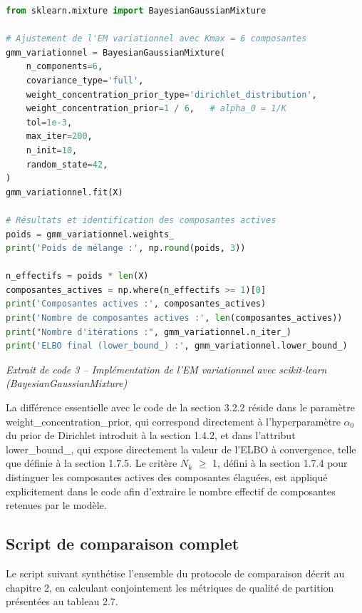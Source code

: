 \begin{lstlisting}[language=Python]
from sklearn.mixture import BayesianGaussianMixture

# Ajustement de l'EM variationnel avec Kmax = 6 composantes
gmm_variationnel = BayesianGaussianMixture(
    n_components=6,
    covariance_type='full',
    weight_concentration_prior_type='dirichlet_distribution',
    weight_concentration_prior=1 / 6,   # alpha_0 = 1/K
    tol=1e-3,
    max_iter=200,
    n_init=10,
    random_state=42,
)
gmm_variationnel.fit(X)

# Résultats et identification des composantes actives
poids = gmm_variationnel.weights_
print('Poids de mélange :', np.round(poids, 3))

n_effectifs = poids * len(X)
composantes_actives = np.where(n_effectifs >= 1)[0]
print('Composantes actives :', composantes_actives)
print('Nombre de composantes actives :', len(composantes_actives))
print("Nombre d'itérations :", gmm_variationnel.n_iter_)
print('ELBO final (lower_bound_) :', gmm_variationnel.lower_bound_)
\end{lstlisting}
\begin{center}\small\emph{Extrait de code 3 -- Implémentation de l'EM variationnel avec scikit-learn (BayesianGaussianMixture)}\end{center}
La différence essentielle avec le code de la section 3.2.2 réside dans le paramètre weight\_concentration\_prior, qui correspond directement à l'hyperparamètre $\alpha _{0}$ du prior de Dirichlet introduit à la section 1.4.2, et dans l'attribut lower\_bound\_, qui expose directement la valeur de l'ELBO à convergence, telle que définie à la section 1.7.5. Le critère $N_{k}$ $\geq $ 1, défini à la section 1.7.4 pour distinguer les composantes actives des composantes élaguées, est appliqué explicitement dans le code afin d'extraire le nombre effectif de composantes retenues par le modèle.

\subsection{Script de comparaison complet}
Le script suivant synthétise l'ensemble du protocole de comparaison décrit au chapitre 2, en calculant conjointement les métriques de qualité de partition présentées au tableau 2.7.

